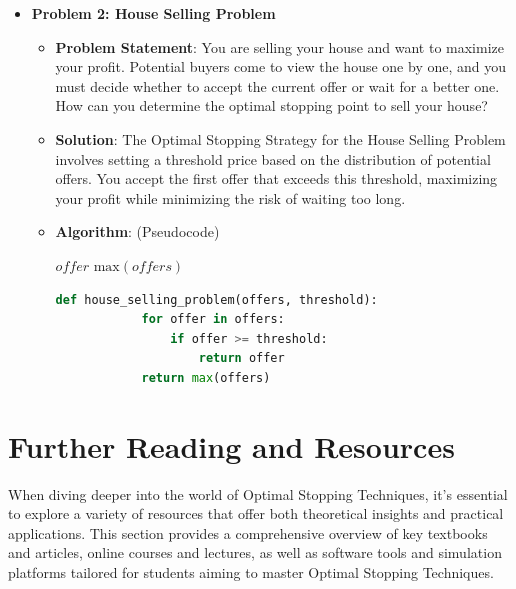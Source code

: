 \documentclass[12pt]{book} %
\begin{document}
\begin{itemize}
    \item \textbf{Problem 2: House Selling Problem}
    \begin{itemize}
        \item \textbf{Problem Statement}: You are selling your house and want to maximize your profit. Potential buyers come to view the house one by one, and you must decide whether to accept the current offer or wait for a better one. How can you determine the optimal stopping point to sell your house?
        \item \textbf{Solution}: The Optimal Stopping Strategy for the House Selling Problem involves setting a threshold price based on the distribution of potential offers. You accept the first offer that exceeds this threshold, maximizing your profit while minimizing the risk of waiting too long.
        \item \textbf{Algorithm}: (Pseudocode)
        \begin{algorithm}[H]
        \caption{Optimal Stopping for House Selling Problem}
        \begin{algorithmic}[1]
                    \State \Return $offer$
                \EndIf
            \EndFor
            \State \Return $\text{max}(offers)$ 
        \EndFunction
        \end{algorithmic}
        \end{algorithm}
        \FloatBarrier
        \begin{lstlisting}[language=Python]
        def house_selling_problem(offers, threshold):
            for offer in offers:
                if offer >= threshold:
                    return offer
            return max(offers)
        \end{lstlisting}
        \FloatBarrier
    \end{itemize}
\end{itemize}

\section{Further Reading and Resources}
When diving deeper into the world of Optimal Stopping Techniques, it's essential to explore a variety of resources that offer both theoretical insights and practical applications. This section provides a comprehensive overview of key textbooks and articles, online courses and lectures, as well as software tools and simulation platforms tailored for students aiming to master Optimal Stopping Techniques.
\end{document}

